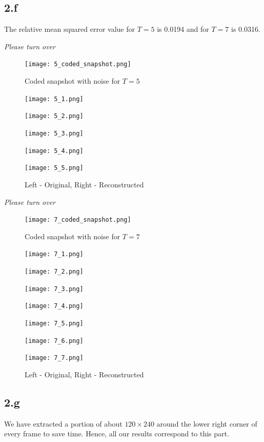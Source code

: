 \documentclass[12pt]{article}
\begin{document}
\subsection*{2.f}
The relative mean squared error value for $T = 5$ is 0.0194 and for $T = 7$ is 0.0316.
\vspace{2cm}
\begin{center}
\textit{Please turn over}
\end{center}
\newpage
\begin{figure}[ht]
	\centering
	\texttt{[image: 5\_coded\_snapshot.png]}
	\caption{Coded snapshot with noise for $T = 5$}
\end{figure}
\begin{figure}[ht]
	\centering
	\begin{minipage}[bt]{0.4\linewidth}
		\centering
			\texttt{[image: 5\_1.png]}
			\caption{$t = 1$}
			\texttt{[image: 5\_2.png]}
			\caption{$t = 2$}
			\texttt{[image: 5\_3.png]}
			\caption{$t = 3$}
	\end{minipage}
\begin{minipage}[bt]{0.5\linewidth}
\centering
	\texttt{[image: 5\_4.png]}
	\caption{$t = 4$}
	\texttt{[image: 5\_5.png]}
	\caption{$t = 5$}
\end{minipage}
\caption{Left - Original, Right - Reconstructed}
\end{figure}
\vspace{3cm}
\begin{center}
	\textit{Please turn over}
\end{center}
\newpage
\begin{figure}[ht]
	\centering
	\texttt{[image: 7\_coded\_snapshot.png]}
	\caption{Coded snapshot with noise for $T = 7$}
\end{figure}
\begin{figure}[ht]
\centering
\begin{minipage}[bt]{0.4\linewidth}
	\centering
	\texttt{[image: 7\_1.png]}
	\caption{$t = 1$}
	\texttt{[image: 7\_2.png]}
	\caption{$t = 2$}
	\texttt{[image: 7\_3.png]}
	\caption{$t = 3$}
	\texttt{[image: 7\_4.png]}
	\caption{$t = 4$}
\end{minipage}
\begin{minipage}[bt]{0.5\linewidth}
	\centering
	\texttt{[image: 7\_5.png]}
	\caption{$t = 5$}
	\texttt{[image: 7\_6.png]}
	\caption{$t = 6$}
	\texttt{[image: 7\_7.png]}
	\caption{$t = 7$}
\end{minipage}
\caption{Left - Original, Right - Reconstructed}
\end{figure}
\subsection*{2.g}
We have extracted a portion of about $120 \times 240$ around the lower right corner of every frame to save time. Hence, all our results correspond to this part. 
\newpage
\end{document}
